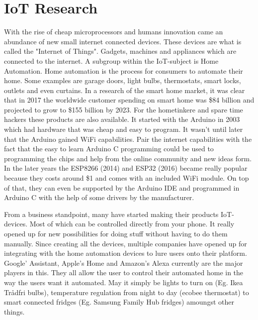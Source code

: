 \section{IoT Research}

With the rise of cheap microprocessors and humans innovation came an abundance of new small internet connected devices. These devices are what is called the "Internet of Things". Gadgets, machines and appliances which are connected to the internet\cite{iot-definition}. A subgroup within the IoT-subject is Home Automation. Home automation is the process for consumers to automate their home. Some examples are garage doors, light bulbs, thermostats, smart locks, outlets and even curtains. In a research of the smart home market, it was clear that in 2017 the worldwide customer spending on smart home was \$84 billion and projected to grow to \$155 billion by 2023\cite{home-auto-growth}. For the hometinkere and spare time hackers these products are also available. It started with the Arduino in 2003 which had hardware that was cheap and easy to program\cite{arduino-history}. It wasn't until later that the Arduino gained WiFi capabilities. Pair the internet capabilities with the fact that the easy to learn Arduino C programming could be used to programming the chips and help from the online community and new ideas form. 
In the later years the ESP8266 (2014) and ESP32 (2016) became really popular because they costs around \$1 and comes with an included WiFi module. On top of that, they can even be supported by the Arduino IDE and programmed in Arduino C with the help of some drivers by the manufacturer.

From a business standpoint, many have started making their products IoT-devices. Most of which can be controlled directly from your phone.  It really opened up for new possibilities for doing stuff without having to do them manually. Since creating all the devices, multiple companies have opened up for integrating with the home automation devices to lure users onto their platform. Google' Assistant\cite{google-assistant}, Apple's Home\cite{apple-homekit} and Amazon's Alexa\cite{amazon-alexa} currently are the major players in this. They all allow the user to control their automated home in the way the users want it automated. May it simply be lights to turn on (Eg. Ikea Trådfri bulbs), temperature regulation from night to day (ecobee thermostat) to smart connected fridges (Eg. Samsung Family Hub fridges) amoungst other things. 